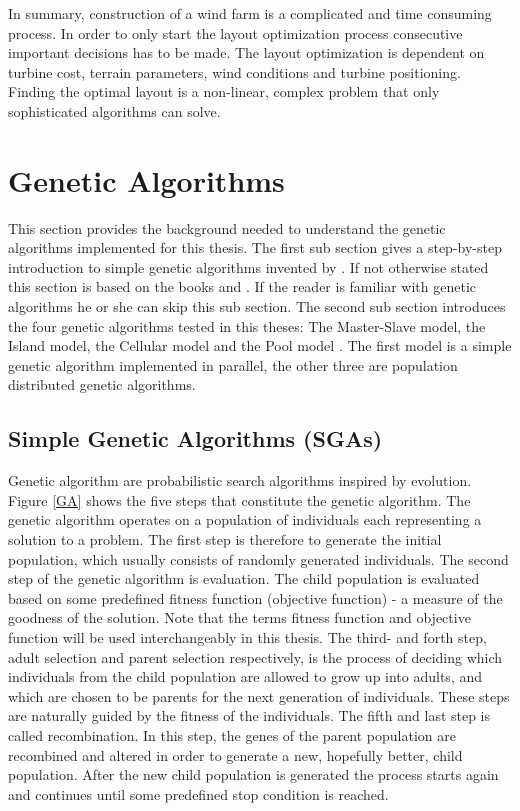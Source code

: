 \noindent In summary, construction of a wind farm is a complicated and time consuming process. In order to only start the layout optimization process consecutive important decisions has to be made. The layout optimization is dependent on turbine cost, terrain parameters, wind conditions and turbine positioning. Finding the optimal layout is a non-linear, complex problem that only sophisticated algorithms can solve.


\section{Genetic Algorithms}\label{section:ga}
This section provides the background needed to understand the genetic algorithms implemented for this thesis. The first sub section gives a step-by-step introduction to simple genetic algorithms invented by \cite{Holland}. If not otherwise stated this section is based on the books \cite{Holland} and \cite{Goldberg}. If the reader is familiar with genetic algorithms he or she can skip this sub section. The second sub section introduces the four genetic algorithms tested in this theses: The Master-Slave model, the Island model, the Cellular model and the Pool model \citep{Gong}. The first model is a simple genetic algorithm implemented in parallel, the other three are population distributed genetic algorithms.\\


\subsection{Simple Genetic Algorithms (SGAs)}\label{subsection:sga}
Genetic algorithm are probabilistic search algorithms inspired by evolution. Figure \ref{GA} shows the five steps that constitute the genetic algorithm. The genetic algorithm operates on a population of individuals each representing a solution to a problem. The first step is therefore to generate the initial population, which usually consists of randomly generated individuals. The second step of the genetic algorithm is evaluation. The child population is evaluated based on some predefined fitness function (objective function) - a measure of the goodness of the solution. Note that the terms fitness function and objective function will be used interchangeably in this thesis. The third- and forth step, adult selection and parent selection respectively, is the process of deciding which individuals from the child population are allowed to grow up into adults, and which are chosen to be parents for the next generation of individuals. These steps are naturally guided by the fitness of the individuals. The fifth and last step is called recombination. In this step, the genes of the parent population are recombined and altered in order to generate a new, hopefully better, child population. After the new child population is generated the process starts again and continues until some predefined stop condition is reached. \\


